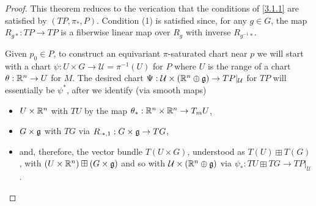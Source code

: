 \begin{proof}
This theorem reduces to the verication that the conditions of \ref{3.1.1} are satisfied by $(TP, \pi_*, P)$. Condition (1) is satisfied since, for any $g \in G$, the map $R_{g*}:TP \to TP$ is a fiberwise linear map over $R_g$ with inverse $R_{g^{-1} *}$.

Given $p_0 \in P$, to construct an equivariant $\pi$-saturated chart near $p$ we will start with a chart $\psi:U \times G \to \mathcal U = \pi^{-1}(U)$ for $P$ where $U$ is the range of a chart $\theta:\mathbb{R}^n \to U$ for $M$. The desired chart $\Psi: \mathcal U \times (\mathbb{R}^n \oplus \mathfrak{g}) \to TP|_{\mathcal U}$ for $TP$ will essentially be $\psi^*$, after we identify (via smooth maps) 
    \begin{itemize}
    
    \item $U \times \mathbb{R}^n$ with $TU$ by the map $\theta_{*}: \mathbb{R}^n \times \mathbb{R}^n \to T_m U$,  
    
    \item $G \times \mathfrak{g}$ with $TG$ via $R_{\cdot *, 1}: G \times \mathfrak{g} \to T G$,
    
    \item and, therefore, the vector bundle $T(U \times G)$, understood as $T(U) \boxplus T(G)$, with $(U \times \mathbb{R}^n) \boxplus (G \times \mathfrak{g})$ and so with $\mathcal U \times (\mathbb{R}^n \oplus \mathfrak{g})$ via $\psi_*: TU \boxplus TG \to TP|_{\mathcal U}$.
    
    \end{itemize}


\end{proof}
